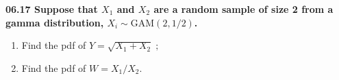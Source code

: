 






\vspace{1cm}

\begin{exercise1}
  \bf{06.17} Suppose that $X_1$ and $X_2$ are a random sample of size 2 from a gamma distribution, $X_i\sim\mathrm{GAM}(2,1/2)$.
    \begin{enumerate}
      \item
        Find the pdf of $Y=\sqrt{X_1+X_2}\;;$
      \item
        Find the pdf of $W={X_1}/{X_2}$.
    \end{enumerate}
\end{exercise1}

